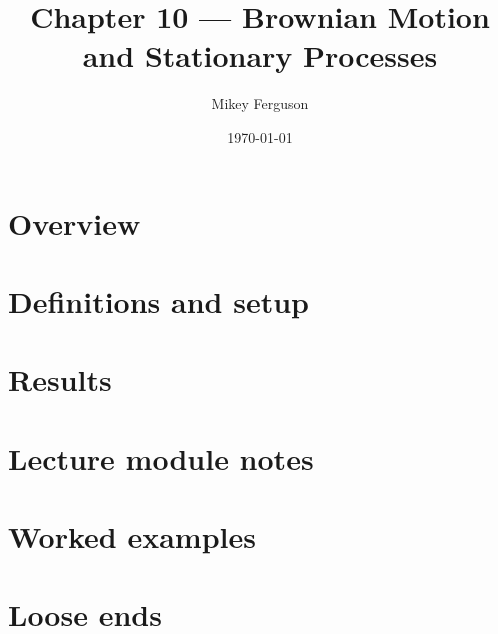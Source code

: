 \documentclass[11pt]{article}
\title{Chapter 10 --- Brownian Motion and Stationary Processes}
\author{Mikey Ferguson}
\date{\today}
\begin{document}
\maketitle
\tableofcontents
\bigskip

\section{Overview}

\section{Definitions and setup}

\section{Results}

\section{Lecture module notes}

\section{Worked examples}

\section{Loose ends}
\end{document}
